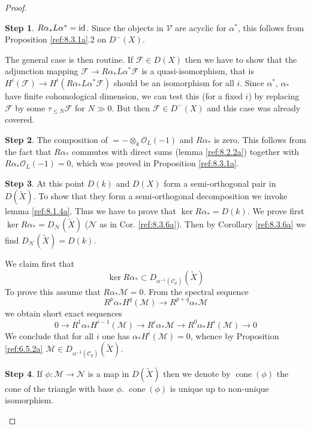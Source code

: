 \documentclass{amsproc}
\def\Cscr{{\mathcal C}}
\def\Fscr{{\mathcal F}}
\def\Mscr{{\mathcal M}}
\def\Nscr{{\mathcal N}}
\def\Oscr{{\mathcal O}}
\def\Vscr{{\mathcal V}}
\DeclareMathOperator{\cone}{cone}
\def\Id{\text{id}}
\def\ker{\operatorname {ker}}
\def\r{\rightarrow}
\let\oldtext\text
\def\text#1{\oldtext{\upshape #1}}
\theoremstyle{definition}
\newtheorem{step}{Step}
\theoremstyle{remark}
\numberwithin{equation}{section}
\numberwithin{table}{section}
\numberwithin{figure}{section}
\begin{document}
\begin{proof}
\begin{step} 
\label{ref:1b}
$R\alpha_\ast L\alpha^\ast=\Id$. Since the objects in $\Vscr$ are
acyclic for $\alpha^\ast$, this follows from Proposition \ref{ref:8.3.1a}.2
on $D^-(X)$.
 
The general case is then routine. If $\Fscr\in D(X)$ then we have to
show that the adjunction mapping $\Fscr\r R\alpha_\ast
L\alpha^\ast\Fscr$ is a quasi-isomorphism, that is $H^i(\Fscr)\r
H^i(R\alpha_\ast L\alpha^\ast\Fscr)$ should be an isomorphism for all $i$. Since
$\alpha^\ast$, $\alpha_\ast$ have finite cohomological dimension, we
can test this (for a fixed $i$) by replacing $\Fscr$ by some $\tau_{\le
  N}\Fscr$ for $N\gg 0$. But then $\Fscr\in D^-(X)$ and this case was
already covered.
\end{step}
\begin{step}
\label{ref:2a} The composition of $=-\otimes_k \Oscr_L(-1)$ and 
$R\alpha_\ast$ is zero. This follows from the fact that
$R\alpha_\ast$ commutes with direct sums (lemma \ref{ref:8.2.2a})
together with $R\alpha_\ast\Oscr_L(-1)=0$, which was proved in
Proposition \ref{ref:8.3.1a}.
\end{step}

\begin{step} 
\label{ref:3b}
At this point $D(k)$ and $D(X)$ form a semi-orthogonal pair in
$D(\tilde{X})$. To show that they form a semi-orthogonal
decomposition we invoke lemma \ref{ref:8.1.4a}. Thus we have to prove
that $\ker R\alpha_\ast= D(k)$.  We prove first $\ker
R\alpha_\ast=D_\Nscr(\tilde{X})$ ($\Nscr$ as in Cor. \ref{ref:8.3.6a}).
Then by Corollary \ref{ref:8.3.6a} we find $D_\Nscr(\tilde{X})=D(k)$.
  
We claim first that
\[
\ker R\alpha_\ast\subset D_{\alpha^{-1}(\Cscr_p)}(\tilde{X})
\]
To prove this assume that $R\alpha_\ast\Mscr=0$. From the spectral
  sequence 
\[
R^p\alpha_\ast H^q(\Mscr)\r  R^{p+q}\alpha_\ast \Mscr
\]
we obtain short exact sequences 
\[
0\r R^1\alpha_\ast H^{i-1}(\Mscr)\r R^i\alpha_\ast\Mscr \r
R^0\alpha_\ast H^i(\Mscr)\r 0
\]
We conclude that for all $i$ one has $\alpha_\ast H^i(\Mscr)=0$, whence by
Proposition \ref{ref:6.5.2a} $\Mscr\in D_{\alpha^{-1}(\Cscr_p)}(\tilde{X})$. 
\end{step}
\begin{step}
\label{ref:4b}
 If $\phi:\Mscr\r\Nscr$ is a map in $D(\tilde{X})$
then we denote by $\cone(\phi)$ the cone of the triangle with base
$\phi$. $\cone(\phi)$ is unique up to non-unique isomorphism. 


\end{step}
\end{proof}
\end{document}
